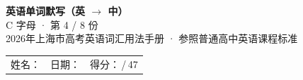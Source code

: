 \documentclass[10pt,a4paper]{article}
\begin{document}
\pagestyle{plain}

\begin{center}
{\LARGE\bfseries 英语单词默写（英 $\to$ 中）}\\[0.22em]
{\large C 字母 · 第 4 / 8 份}\\[0.18em]
{\small 2026年上海市高考英语词汇用法手册 · 参照普通高中英语课程标准}
\end{center}

\vspace{0.25em}
\noindent\begin{tabular}{@{}p{}@{}p{}@{}p{}@{}}
姓名：\underline{\hspace{2.0cm}} & 日期：\underline{\hspace{2.0cm}} & 得分：\underline{\hspace{1.3cm}}\,/\,47 \\
\end{tabular}

\vspace{0.3em}

\vspace{0.08em}
\end{document}
